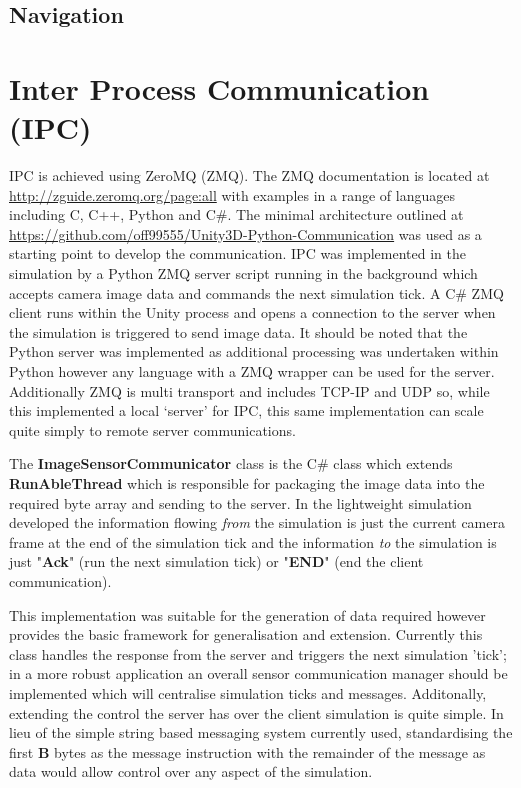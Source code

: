 \documentclass{article}
\begin{document}
\subsection{Navigation}



\section{Inter Process Communication (IPC)}\label{s:ipc}

IPC is achieved using ZeroMQ (ZMQ). The ZMQ documentation is located at \url{http://zguide.zeromq.org/page:all} with examples in a range of languages including C, C++, Python and C\#. The minimal architecture outlined at \url{https://github.com/off99555/Unity3D-Python-Communication} was used as a starting point to develop the communication. IPC was implemented in the simulation by a Python ZMQ server script running in the background which accepts camera image data and commands the next simulation tick. A C\# ZMQ client runs within the Unity process and opens a connection to the server when the simulation is triggered to send image data. It should be noted that the Python server was implemented as additional processing was undertaken within Python however any language with a ZMQ wrapper can be used for the server. Additionally ZMQ is multi transport and includes TCP-IP and UDP so, while this implemented a local `server' for IPC, this same implementation can scale quite simply to remote server communications. 

The \textbf{ImageSensorCommunicator} class is the C\# class which extends \textbf{RunAbleThread} which is responsible for packaging the image data into the required byte array and sending to the server. In the lightweight simulation developed the information flowing \textit{from} the simulation is just the current camera frame at the end of the simulation tick and the information \textit{to} the simulation is just "\textbf{Ack}" (run the next simulation tick) or "\textbf{END}" (end the client communication).

This implementation was suitable for the generation of data required however provides the basic framework for generalisation and extension. Currently this class handles the response from the server and triggers the next simulation 'tick'; in a more robust application an overall sensor communication manager should be implemented which will centralise simulation ticks and messages. Additonally, extending the control the server has over the client simulation is quite simple. In lieu of the simple string based messaging system currently used, standardising the first \textbf{B} bytes as the message instruction with the remainder of the message as data would allow control over any aspect of the simulation. 
\end{document}
